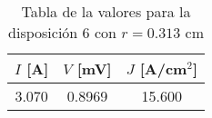 \begin{table}[h!]
    \centering
\begin{tabular}{ccc}
\toprule
$I$ [A] & $V$ [mV] & $J$ [A/cm$^2$] \\
\midrule
3.070 & 0.8969 & 15.600 \\
\bottomrule
\end{tabular}
    \caption{Tabla de la valores para la disposición 6 con $r=0.313$ cm}
    \label{Tab:VIJ_mini_6}
\end{table}
